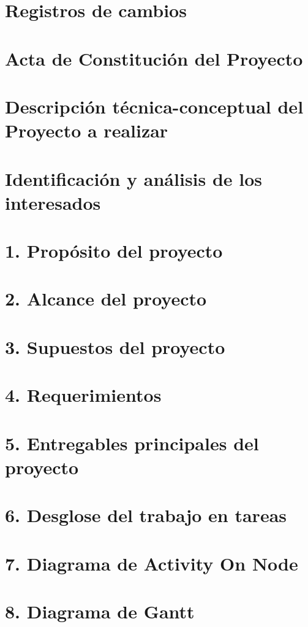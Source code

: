\documentclass[12pt]{charter}
\begin{document}
\maketitle
\thispagestyle{empty}
\pagebreak


\thispagestyle{empty}
\tableofcontents{}
\pagebreak


\section{Registros de cambios}
\section{Acta de Constitución del Proyecto}
\section{Descripción técnica-conceptual del Proyecto a realizar}
\section{Identificación y análisis de los interesados}
\section{1. Propósito del proyecto}
\section{2. Alcance del proyecto}
\section{3. Supuestos del proyecto}
\section{4. Requerimientos}
\section{5. Entregables principales del proyecto}
\section{6. Desglose del trabajo en tareas}
\section{7. Diagrama de Activity On Node}
\section{8. Diagrama de Gantt}
\end{document}
